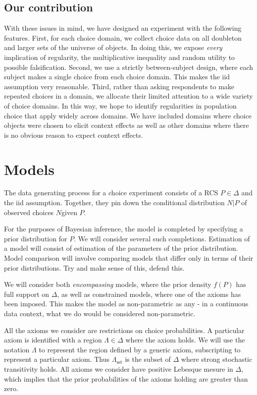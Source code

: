 \documentclass[11pt,letter]{article}
\begin{document}
\subsection{Our contribution}

With these issues in mind, we have designed an experiment with the following features.
First, for each choice domain, we collect choice data on all doubleton and larger sets of the universe of objects.
In doing this, we expose {\em every} implication of regularity, the multiplicative inequality and random utility to possible falsification.
Second, we use a strictly between-subject design, where each subject makes a single choice from each choice domain.
This makes the iid assumption very reasonable.
Third, rather than asking respondents to make repeated choices in a domain, we allocate their limited attention to a wide variety of choice domains.
In this way, we hope to identify regularities in population choice that apply widely across domains.
We have included domains where choice objects were chosen to elicit context effects as well as other domains where there is no obvious reason to expect context effects.

\section{Models}\label{s:models}

The data generating process for a choice experiment consists of a RCS $P \in \Delta$ and the iid assumption.
Together, they pin down the conditional distribution $N|P$ of observed choices $N$given $P$.

For the purposes of Bayesian inference, the model is completed by specifying a prior distribution for $P$.
We will consider several such completions.
Estimation of a model will consist of estimation of the parameters of the prior distribution.
Model comparison will involve comparing models that differ only in terms of their prior distributions.
Try and make sense of this, defend this.

We will consider both {\em encompassing} models, where the prior density $f(P)$ has full support on $\Delta$, as well as constrained models, where one of the axioms has been imposed.
This makes the model as non-parametric as any - in a continuous data context, what we do would be considered non-parametric.

All the axioms we consider are restrictions on choice probabilities.
A particular axiom is identified with a region $\Lambda \in \Delta$ where the axiom holds.
We will use the notation $\Lambda$ to represent the region defined by a generic axiom, subscripting to represent a particular axiom.
Thus $\Lambda_{\mathrm{sst}}$ is the subset of $\Delta$ where strong stochastic transitivity holds.
All axioms we consider have positive Lebesque mesure in $\Delta$, which implies that the prior probabilities of the axioms holding are greater than zero.
\end{document}
